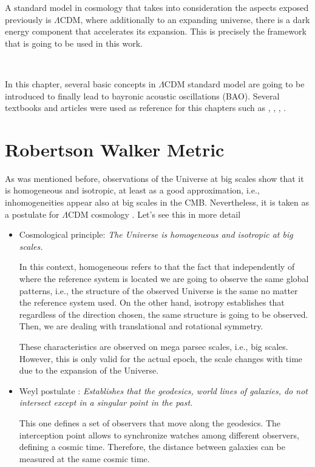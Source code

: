 A standard model in cosmology that takes into consideration the aspects exposed previously is 
$\Lambda$CDM, where additionally to an expanding universe, there is a dark energy component that accelerates its expansion. This is precisely the framework that is going to be used in this work. 

\

In this chapter, several basic concepts in $\Lambda$CDM standard model are going to 
be introduced to finally lead to bayronic acoustic oscillations (BAO). Several textbooks and
articles were used as reference for this chapters such as \cite{Longair}, \cite{bosch},
\cite{padma}, \cite{Pilar}. 



\section{ Robertson Walker Metric}

As was mentioned before, observations of the Universe at big scales show 
that it is homogeneous and isotropic, at least as a good approximation, i.e., 
inhomogeneities appear also at big scales in the CMB. Nevertheless, it is taken
as a postulate for $\Lambda$CDM cosmology . Let's see this in more detail

\begin{itemize}
\item Cosmological principle: \emph{ The Universe is homogeneous and isotropic 
at big scales.}


In this context, homogeneous refers to that the fact that independently of 
where the reference system is located we are going to observe the same global 
patterns, i.e., the structure of the observed Universe is the same no matter 
the reference system used.
On the other hand, isotropy establishes that regardless of the direction chosen, 
the same structure is going to be observed. Then, we are dealing with translational
and rotational symmetry. 

These characteristics are observed on mega parsec scales, i.e., big scales. 
However, this is only valid for the actual epoch, the scale changes with time due 
to the expansion of the Universe. 


\item Weyl postulate :\emph{ Establishes that the geodesics, world lines of 
galaxies, do not intersect except in a singular point in the past.} 

This one defines a set of observers that move along the geodesics. 
The interception point allows to synchronize watches among different observers,
defining a cosmic time. Therefore, the distance between galaxies can
be measured at the same cosmic time. 

\end{itemize} 

